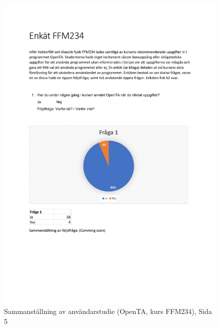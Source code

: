 \begin{figure}[hbtp]
    \centering
    \includegraphics[page=5,scale=0.85]{appendix/form_survey.pdf}
    \caption*{Sammanställning av användarstudie (OpenTA, kurs FFM234), Sida 5}
    \label{fig:openform5}
\end{figure}


